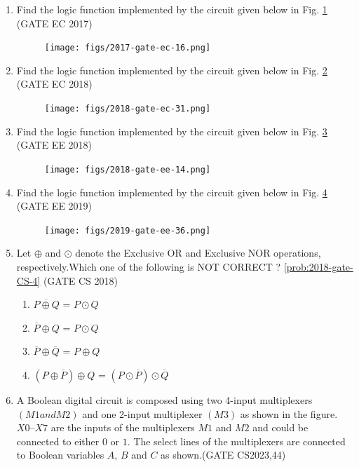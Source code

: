 \begin{enumerate}
\item 
\label{prob:2017-gate-ec-16}
Find the logic function implemented by the circuit given below 
in Fig.
\ref{fig:2017-gate-ec-16}
\hfill (GATE EC 2017)
\begin{figure}[!ht]
\centering
	\texttt{[image: figs/2017-gate-ec-16.png]}
\caption{}
\label{fig:2017-gate-ec-16}
\end{figure}
\item 
\label{prob:2018-gate-ec-31}
Find the logic function implemented by the circuit given below 
in Fig.
\ref{fig:2018-gate-ec-31}
\hfill (GATE EC 2018)
\begin{figure}[!ht]
\centering
	\texttt{[image: figs/2018-gate-ec-31.png]}
\caption{}
\label{fig:2018-gate-ec-31}
\end{figure}
\item 
\label{prob:2018-gate-ee-14}
Find the logic function implemented by the circuit given below 
in Fig.
\ref{fig:2018-gate-ee-14}
\hfill (GATE EE 2018)
\begin{figure}[!ht]
\centering
	\texttt{[image: figs/2018-gate-ee-14.png]}
\caption{}
\label{fig:2018-gate-ee-14}
\end{figure}
\item 
\label{prob:2019-gate-ee-36}
Find the logic function implemented by the circuit given below 
in Fig.
\ref{fig:2019-gate-ee-36}
\hfill (GATE EE 2019)
\begin{figure}[!ht]
\centering
	\texttt{[image: figs/2019-gate-ee-36.png]}
\caption{}
\label{fig:2019-gate-ee-36}
\end{figure}
\item 
\label{prob:2018-gate-CS-4}		
Let $\oplus$ and $\odot$ denote the Exclusive OR and Exclusive NOR operations, respectively.Which one of the following is NOT CORRECT ?
\ref{prob:2018-gate-CS-4}
\hfill (GATE CS 2018)
\begin{samepage}
\begin{enumerate}[label=(\Alph*)]
    \item $\overline{P\oplus Q}$ = $ P \odot Q $
    \item $\overline{P} \oplus Q$ = $ P \odot Q $
    \item $\overline{P} \oplus \overline{Q}$ = $ P \oplus Q $
    \item $(P \oplus \overline{P}) \oplus Q$ = $(P \odot \overline{P}) \odot \overline{Q}$
\end{enumerate}
\end{samepage}

\item A Boolean digital circuit is composed using two 4-input multiplexers $(M1 and M2)$ and one 2-input multiplexer $(M3)$ as shown in the figure. $X0$–$X7$ are the inputs of the multiplexers $M1$ and $M2$ and could be connected to either $0$ or $1$. The select lines of the multiplexers are connected to Boolean variables $A$, $B$ and $C$ as shown.\hfill(GATE CS2023,44)


\end{enumerate}
